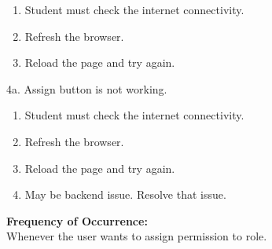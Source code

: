 \documentclass[12pt]{article}
\begin{document}
\begin{enumerate}
\item Student must check the internet connectivity.
\item Refresh the browser.
\item Reload the page and try again.
\end{enumerate}
4a. Assign button is not working.
\begin{enumerate}
\item Student must check the internet connectivity.
\item Refresh the browser.
\item Reload the page and try again.
\item May be backend issue. Resolve that issue.
\end{enumerate}
\textbf{Frequency of Occurrence:}\\
Whenever the user wants to assign permission to role.
\end{document}
